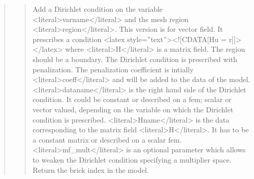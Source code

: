\documentclass[a4paper,11pt,english]{sphinxmanual}
\begin{document}
\begin{quote}
\begin{quote}
\sphinxAtStartPar
Add a Dirichlet condition on the variable \textless{}literal\textgreater{}varname\textless{}/literal\textgreater{} and the mesh
region \textless{}literal\textgreater{}region\textless{}/literal\textgreater{}. This version is for vector field.
It prescribes a condition \textless{}latex style=”text”\textgreater{}\textless{}!{[}CDATA{[}Hu = r{]}{]}\textgreater{}\textless{}/latex\textgreater{}
where \textless{}literal\textgreater{}H\textless{}/literal\textgreater{} is a matrix field.
The region should be a boundary. The Dirichlet
condition is prescribed with penalization. The penalization coefficient
is intially \textless{}literal\textgreater{}coeff\textless{}/literal\textgreater{} and will be added to the data of the model.
\textless{}literal\textgreater{}dataname\textless{}/literal\textgreater{} is the right hand side of the Dirichlet condition.
It could be constant or described on a fem; scalar or vector valued,
depending on the variable on which the Dirichlet condition is prescribed.
\textless{}literal\textgreater{}Hname\textless{}/literal\textgreater{} is the data
corresponding to the matrix field \textless{}literal\textgreater{}H\textless{}/literal\textgreater{}. It has to be a constant matrix
or described on a scalar fem.
\textless{}literal\textgreater{}mf\_mult\textless{}/literal\textgreater{} is an optional parameter which allows to weaken the
Dirichlet condition specifying a multiplier space.
Return the brick index in the model.
\end{quote}

\sphinxAtStartPar
{}
\begin{quote}


\end{quote}
\end{quote}
\end{document}
